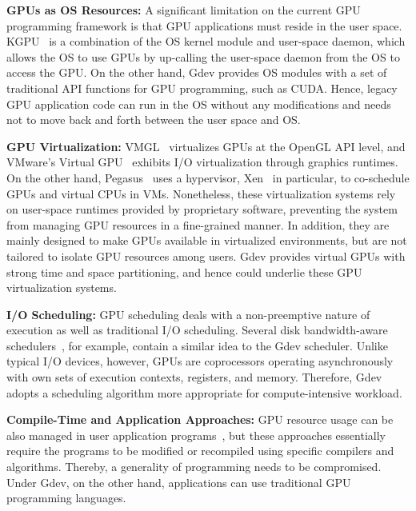 \begin{comment}
Comparisons of Gdev and representatives of the above GPU resource
management approaches are summarized in Table~\ref{tab:related_work}.
\begin{table*}[t]
 \caption{Comparisons of Gdev and prior GPU resource management
 approaches.}
 \label{tab:related_work}
 \begin{center}
  {\sf
  \begin{tabular}{|l|p{12.8cm}|}
   \hline
   \hline
  \end{tabular}
  }
 \end{center}
\vspace{-1em}
\end{table*}
\end{comment}

\textbf{GPUs as OS Resources:}
A significant limitation on the current GPU programming framework is
that GPU applications must reside in the user space.
KGPU~\cite{Sun_SYSTOR12} is a combination of the OS kernel
module and user-space daemon, which allows the OS to use GPUs by
up-calling the user-space daemon from the OS to access the GPU.
On the other hand, Gdev provides OS modules with a set of traditional
API functions for GPU programming, such as CUDA.
Hence, legacy GPU application code can run in the OS without any
modifications and needs not to move back and forth between the user
space and OS.

\textbf{GPU Virtualization:}
VMGL~\cite{Lagar-Cavilla_VEE07} virtualizes GPUs at the OpenGL
API level, and VMware's Virtual GPU~\cite{Dowty_SIGOPS09} exhibits I/O
virtualization through graphics runtimes.
On the other hand, Pegasus~\cite{Gupta_ATC11} uses a hypervisor,
Xen~\cite{Barham_SOSP03} in particular, to co-schedule GPUs and virtual
CPUs in VMs.
Nonetheless, these virtualization systems rely on user-space runtimes
provided by proprietary software, preventing the system from managing
GPU resources in a fine-grained manner. 
In addition, they are mainly designed to make GPUs available in
virtualized environments, but are not tailored to isolate GPU resources
among users.
Gdev provides virtual GPUs with strong time and space partitioning, and
hence could underlie these GPU virtualization systems.

\textbf{I/O Scheduling:}
GPU scheduling deals with a non-preemptive nature of execution as well
as traditional I/O scheduling.
Several disk bandwidth-aware schedulers~\cite{Gulati_FAST09,
Povzner_EUROSYS08, Wang_FAST07}, for example, contain a similar idea to
the Gdev scheduler.
Unlike typical I/O devices, however, GPUs are coprocessors operating
asynchronously with own sets of execution contexts, registers, and memory.
Therefore, Gdev adopts a scheduling algorithm more appropriate for
compute-intensive workload.

\textbf{Compile-Time and Application Approaches:}
GPU resource usage can be also managed in user application
programs~\cite{Chen_IPDPS10,Guevara09,Saba_RTSS11}, but these approaches
essentially require the programs to be modified or recompiled using
specific compilers and algorithms.
Thereby, a generality of programming needs to be compromised.
Under Gdev, on the other hand, applications can use traditional GPU
programming languages.

